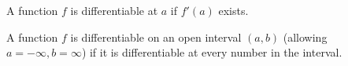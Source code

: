 \begin{frame}
\begin{definition}
A function $f$ is differentiable at $a$ if $f'(a)$ exists.  
\end{definition}

\begin{definition}
A function $f$ is differentiable on an open interval $(a,b)$ (allowing $a=-\infty, b=\infty$) if it is differentiable at every number in the interval.
\end{definition}

\end{frame}
